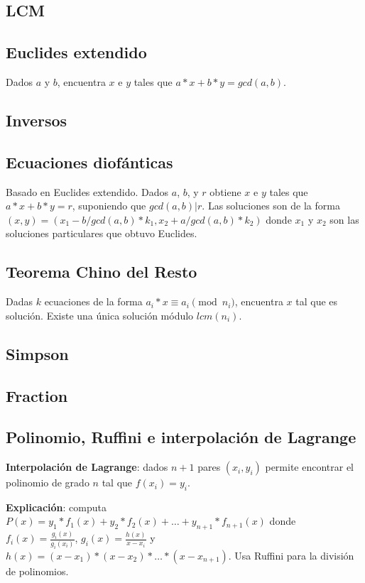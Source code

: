 {\subsection{LCM}
\subsection{Euclides extendido}
Dados $a$ y $b$, encuentra $x$ e $y$ tales que $a*x + b*y = gcd(a, b)$.
\subsection{Inversos}
\subsection{Ecuaciones diofánticas}
Basado en Euclides extendido. Dados $a$, $b$, y $r$ obtiene $x$ e $y$ tales que $a*x + b*y = r$, suponiendo que $gcd(a,b) | r$. Las soluciones son de la forma $(x, y) = (x_1 - b/gcd(a,b) * k_1, x_2 + a/gcd(a,b) * k_2)$ donde $x_1$ y $x_2$ son las soluciones particulares que obtuvo Euclides.
\subsection{Teorema Chino del Resto}
Dadas $k$ ecuaciones de la forma $a_i*x \equiv a_i \pmod {n_i}$, encuentra $x$ tal que es solución. Existe una única solución módulo $lcm(n_i)$.
\subsection{Simpson}
\subsection{Fraction}
\subsection{Polinomio, Ruffini e interpolación de Lagrange}
\textbf{Interpolación de Lagrange}: dados $n+1$ pares $(x_i, y_i)$  permite encontrar el polinomio de grado $n$ tal que $f(x_i) = y_i$. 

\textbf{Explicación}: computa $P(x) = y_1*f_1(x) + y_2*f_2(x) + \ldots + y_{n+1}*f_{n+1}(x)$ donde $f_i(x) = \frac{g_i(x)}{g_i(x_i)}$, $g_i(x) = \frac{h(x)}{x - x_i}$ y $h(x) = (x-x_1)*(x-x_2)*\ldots*(x-x_{n+1})$.
Usa Ruffini para la división de polinomios.

}
